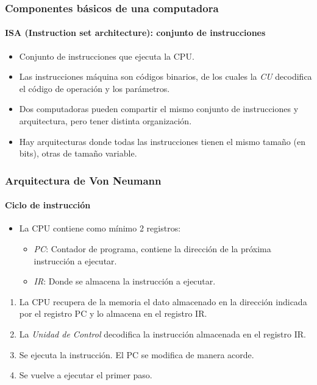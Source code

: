 \documentclass[11pt,a4paper,spanish]{beamer}
\begin{document}
\begin{frame}
    \frametitle{Componentes básicos de una computadora}
    \framesubtitle{ISA (Instruction set architecture): conjunto de
    instrucciones}
    \pause
    \begin{itemize}
        \item Conjunto de instrucciones que ejecuta la CPU. \pause
        \item Las instrucciones máquina son códigos binarios, de los cuales la
            \emph{CU} decodifica el código de operación y los parámetros.
            \pause
        \item Dos computadoras pueden compartir el mismo conjunto de
            instrucciones y arquitectura, pero tener distinta organización.
            \pause
        \item Hay arquitecturas donde todas las instrucciones tienen el mismo
            tamaño (en bits), otras de tamaño variable.
    \end{itemize}
\end{frame}

\begin{frame}
    \frametitle{Arquitectura de Von Neumann}
    \framesubtitle{Ciclo de instrucción}

    \begin{itemize}
        \item La CPU contiene como mínimo 2 registros:
        \begin{itemize}
            \item \emph{PC}: Contador de programa, contiene la dirección de la
                próxima instrucción a ejecutar.
            \item \emph{IR}: Donde se almacena la instrucción a ejecutar.
        \end{itemize}
    \end{itemize}
    \pause
    \begin{enumerate}
        \item La CPU recupera de la memoria el dato almacenado en la dirección
            indicada por el registro PC y lo almacena en el registro IR.
            \pause
        \item La \emph{Unidad de Control} decodifica la instrucción almacenada
            en el registro IR. \pause
        \item Se ejecuta la instrucción. El PC se modifica de manera acorde.
            \pause
        \item Se vuelve a ejecutar el primer paso. \pause
    \end{enumerate}
\end{frame}
\end{document}
